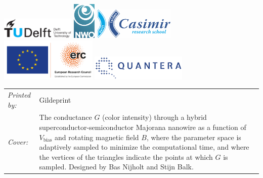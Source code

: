 \begin{titlepage}
\vspace{2\bigskipamount}
\begin{center}
    \includegraphics[height=0.4in]{title/logos/tudelft}
    \hspace{2em}
    \includegraphics[height=0.7in]{title/logos/nwo}
    \hspace{2em}
    \includegraphics[height=0.6in]{title/logos/casimir} \\
    \includegraphics[height=0.8in]{title/logos/eu-erc}
    \includegraphics[width=1.8in]{title/logos/quantera}
\end{center}

\vspace{1\bigskipamount}

\noindent
\begin{tabular}{@{}p{}@{}p{}}
    \textit{Printed by:} & Gildeprint \\[\medskipamount]
    \textit{Cover:} & The conductance $G$ (color intensity) through a hybrid superconductor-semiconductor Majorana nanowire as a function of $V_\textrm{bias}$ and rotating magnetic field $B$, where the parameter space is adaptively sampled to minimize the computational time, and where the vertices of the triangles indicate the points at which $G$ is sampled.
    Designed by Bas Nijholt and Stijn Balk.  %
\end{tabular}


\end{titlepage}
